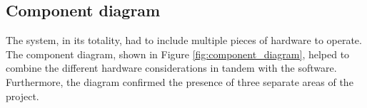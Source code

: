 \subsection{Component diagram}
\begin{figure}[h!]
\end{figure}
The system, in its totality, had to include multiple pieces of hardware to operate. The component diagram, shown in Figure \ref{fig:component_diagram}, helped to combine the different hardware considerations in tandem with the software. Furthermore, the diagram confirmed the presence of three separate areas of the project.

